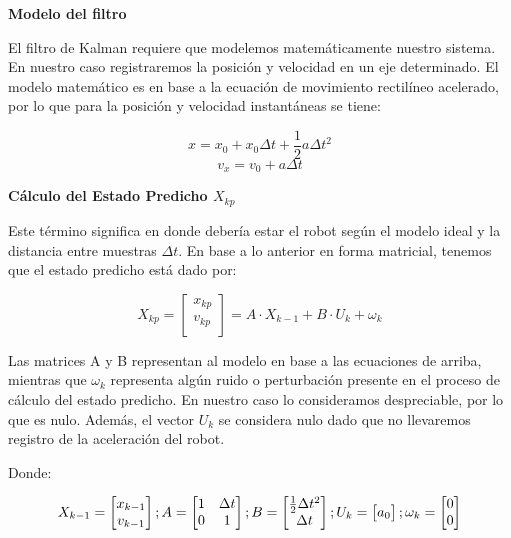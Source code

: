 \textbf{Modelo del filtro} \mbox{} \vspace{8pt}

El filtro de Kalman requiere que modelemos matemáticamente nuestro sistema. En nuestro caso registraremos la posición y velocidad en un eje determinado. El modelo matemático es en base a la ecuación de movimiento rectilíneo acelerado, por lo que para la posición y velocidad instantáneas se tiene:

$$ x = x_0 + x_0 \Delta t + \frac{1}{2} a \Delta t^2 $$
$$ v_x = v_0 + a\Delta t $$

\textbf{Cálculo del Estado Predicho $X_{kp}$} \mbox{} \vspace{8pt}

Este término significa en donde debería estar el robot según el modelo ideal y la distancia entre muestras $\Delta t$. En base a lo anterior en forma matricial, tenemos que el estado predicho está dado por:

$$ X_{kp} =
    \begin{bmatrix} x_{kp} \\ v_{kp} \\ \end{bmatrix}
    =
    A \cdot X_{k-1} + B \cdot U_k + \omega_k
$$

Las matrices A y B representan al modelo en base a las ecuaciones de arriba, mientras que $\omega_k$ representa algún ruido o perturbación presente en el proceso de cálculo del estado predicho. En nuestro caso lo consideramos despreciable, por lo que es nulo. Además, el vector $U_k$ se considera nulo dado que no llevaremos registro de la aceleración del robot.

Donde:

$$
X_{k-1} = \begin{bmatrix} x_{k-1} \\ v_{k-1} \\ \end{bmatrix}
;
A = \begin{bmatrix}
    1 & \Delta t  \\
    0 & 1         \\
    \end{bmatrix} \\
;
B = \begin{bmatrix}
    \frac{1}{2} \Delta t^2 \\
    \Delta t               \\
    \end{bmatrix}          \\
;
U_k = \begin{bmatrix} a_0 \\ \end{bmatrix} \\
;
\omega_k = \begin{bmatrix} 0 \\ 0 \\ \end{bmatrix}
$$

